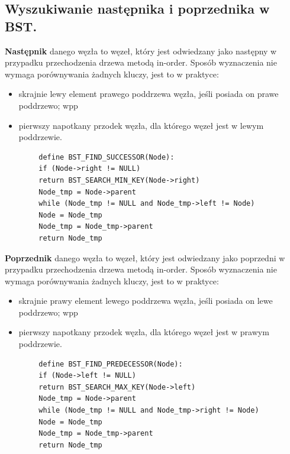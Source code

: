 \documentclass[12pt]{article}
\begin{document}
    \subsection{Wyszukiwanie następnika i poprzednika w BST.}
    \begin{definition}
        \textbf{Następnik} danego węzła to węzeł, który jest odwiedzany jako następny w przypadku przechodzenia drzewa
        metodą in-order. Sposób wyznaczenia nie wymaga porównywania żadnych kluczy, jest to w praktyce:
        \begin{itemize}
            \item skrajnie lewy element prawego poddrzewa węzła, jeśli posiada on prawe poddrzewo; wpp
            \item pierwszy napotkany przodek węzła, dla którego węzeł jest w lewym poddrzewie.
        \end{itemize}
    \end{definition}

    \begin{verbatim}
        define BST_FIND_SUCCESSOR(Node):
        if (Node->right != NULL)
        return BST_SEARCH_MIN_KEY(Node->right)
        Node_tmp = Node->parent
        while (Node_tmp != NULL and Node_tmp->left != Node)
        Node = Node_tmp
        Node_tmp = Node_tmp->parent
        return Node_tmp
    \end{verbatim}


    \begin{definition}
        \textbf{Poprzednik} danego węzła to węzeł, który jest odwiedzany jako poprzedni w przypadku przechodzenia drzewa
        metodą in-order. Sposób wyznaczenia nie wymaga porównywania żadnych kluczy, jest to w praktyce:
        \begin{itemize}
            \item skrajnie prawy element lewego poddrzewa węzła, jeśli posiada on lewe poddrzewo; wpp
            \item pierwszy napotkany przodek węzła, dla którego węzeł jest w prawym poddrzewie.
        \end{itemize}
    \end{definition}

    \begin{verbatim}
        define BST_FIND_PREDECESSOR(Node):
        if (Node->left != NULL)
        return BST_SEARCH_MAX_KEY(Node->left)
        Node_tmp = Node->parent
        while (Node_tmp != NULL and Node_tmp->right != Node)
        Node = Node_tmp
        Node_tmp = Node_tmp->parent
        return Node_tmp
    \end{verbatim}
\end{document}
